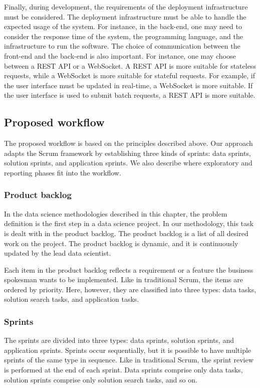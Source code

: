 Finally, during development, the requirements of the deployment infrastructure must be
considered.  The deployment infrastructure must be able to handle the expected usage
of the system.  For instance, in the back-end, one may need to consider the response time
of the system, the programming language, and the infrastructure to run the software.
The choice of communication between the front-end and the back-end is also important.
For instance, one may choose between a REST API or a WebSocket.  A REST API is more suitable
for stateless requests, while a WebSocket is more suitable for stateful requests.  For
example, if the user interface must be updated in real-time, a WebSocket is more suitable.
If the user interface is used to submit batch requests, a REST API is more suitable.

\subsection{Proposed workflow}
\label{sub:workflow}

The proposed workflow is based on the principles described above.  Our approach adapts
the Scrum framework by establishing three kinds of sprints: data sprints, solution sprints, and
application sprints.  We also describe where exploratory and reporting phases fit into the
workflow.

\subsubsection{Product backlog}

In the data science methodologies described in this chapter, the problem definition is the first step
in a data science project.  In our methodology, this task is dealt with in the product
backlog.  The product backlog is a list of all desired work on the project. The product
backlog is dynamic, and it is continuously updated by the
lead data scientist.

Each item in the product backlog reflects a requirement or a feature the business
spokesman wants to be implemented.  Like in traditional Scrum, the items are ordered
by priority.  Here, however, they are classified into three types: data tasks, solution
search tasks, and application tasks.

\subsubsection{Sprints}

The sprints are divided into three types: data sprints, solution sprints, and application
sprints.  Sprints occur sequentially, but it is possible to have multiple sprints of the
same type in sequence.  Like in traditional Scrum, the sprint review is performed at the
end of each sprint.  Data sprints comprise only data tasks, solution sprints comprise only
solution search tasks, and so on.

